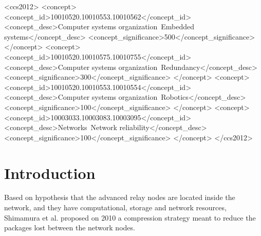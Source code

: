 \documentclass[sigconf]{acmart}
\begin{document}
\begin{CCSXML}
<ccs2012>
 <concept>
  <concept_id>10010520.10010553.10010562</concept_id>
  <concept_desc>Computer systems organization~Embedded systems</concept_desc>
  <concept_significance>500</concept_significance>
 </concept>
 <concept>
  <concept_id>10010520.10010575.10010755</concept_id>
  <concept_desc>Computer systems organization~Redundancy</concept_desc>
  <concept_significance>300</concept_significance>
 </concept>
 <concept>
  <concept_id>10010520.10010553.10010554</concept_id>
  <concept_desc>Computer systems organization~Robotics</concept_desc>
  <concept_significance>100</concept_significance>
 </concept>
 <concept>
  <concept_id>10003033.10003083.10003095</concept_id>
  <concept_desc>Networks~Network reliability</concept_desc>
  <concept_significance>100</concept_significance>
 </concept>
</ccs2012>
\end{CCSXML}






\maketitle

\section{Introduction}
Based on hypothesis that the advanced relay nodes are located inside the network, and they have computational, storage and network resources, Shimamura et al. proposed on 2010 a compression strategy meant to reduce the packages lost between the network nodes\cite{shimamura2010compressing}. 
\end{document}
